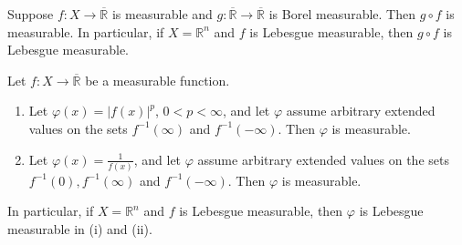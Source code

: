 \documentclass[../main.tex]{subfiles}
\begin{document}
\begin{theorem}{}{}
Suppose $f: X \to \overline{\mathbb{R}}$ is measurable and $g: \overline{\mathbb{R}} \to \overline{\mathbb{R}}$ is Borel measurable. Then $g \circ f$ is measurable. In particular, if $X = \mathbb{R}^n$ and $f$ is Lebesgue measurable, then $g \circ f$ is Lebesgue measurable.
\end{theorem}

\begin{corollary}{}{}
Let $f: X \to \overline{\mathbb{R}}$ be a measurable function.
\begin{enumerate}
    \item[(i)] Let $\varphi(x) = |f(x)|^p$, $0 < p < \infty$, and let $\varphi$ assume arbitrary extended values on the sets $f^{-1}(\infty)$ and $f^{-1}(-\infty)$. Then $\varphi$ is measurable.
    \item[(ii)] Let $\varphi(x) = \frac{1}{f(x)}$, and let $\varphi$ assume arbitrary extended values on the sets $f^{-1}(0), f^{-1}(\infty)$ and $f^{-1}(-\infty)$. Then $\varphi$ is measurable.
\end{enumerate}
In particular, if $X = \mathbb{R}^n$ and $f$ is Lebesgue measurable, then $\varphi$ is Lebesgue measurable in (i) and (ii).

\end{corollary}
\end{document}
